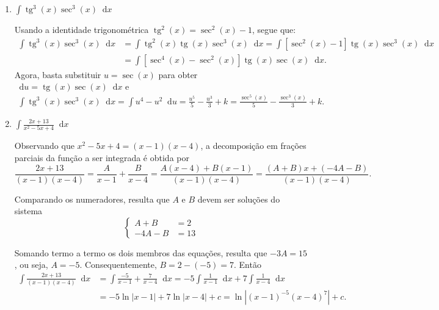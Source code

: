 \documentclass[12pt,a4paper]{article}
\newcommand*\diff{\mathop{}\!\mathrm{d}}
\newcommand*\tg{\operatorname{tg}}
\newcommand*\abs[1]{\left|#1\right|}
\begin{document}
\begin{enumerate}
\begin{enumerate}
\item $\displaystyle \int \tg^3(x)\sec^3(x) \diff x$

Usando a identidade trigonométrica $\tg^2(x) = \sec^2(x)-1$, segue que:
\begin{align*}
  \int \tg^3(x)\sec^3(x) \diff x
& = \int \tg^2(x)\tg(x)\sec^3(x) \diff x
  = \int \left[\sec^2(x) - 1\right]\tg(x)\sec^3(x) \diff x \\
& = \int \left[\sec^4(x) - \sec^2(x)\right]\tg(x)\sec(x) \diff x.
\end{align*}
Agora, basta substituir $u = \sec(x)$ para obter $\diff u = \tg(x)\sec(x) \diff x$ e
\begin{align*}
  \int \tg^3(x)\sec^3(x) \diff x
= \int u^4 - u^2 \diff u
= \frac{u^5}{5} - \frac{u^3}{3} + k
= \frac{\sec^5(x)}{5} - \frac{\sec^3(x)}{3} + k.
\end{align*}

\item $\displaystyle \int \frac{2x + 13}{x^2-5 x+4} \diff x$

Observando que $x^2 - 5x + 4 = (x-1)(x-4)$, a decomposição em frações parciais da função a ser integrada é obtida por
\[
\frac{2x + 13}{(x-1)(x-4)}
= \frac{A}{x-1} + \frac{B}{x-4}
= \frac{A(x-4) + B(x-1)}{(x-1)(x-4)}
= \frac{(A+B)x +(-4A-B)}{(x-1)(x-4)}.
\]

Comparando os numeradores, resulta que $A$ e $B$ devem ser soluções do sistema
\[
\begin{cases}
  A + B &= 2 \\
-4A - B &= 13
\end{cases}
\]

Somando termo a termo os dois membros das equações, resulta que $-3A = 15$, ou seja, $A=-5$. Consequentemente, $B = 2-(-5) = 7$. Então
\begin{align*}
\int \frac{2x + 13}{(x-1)(x-4)} \diff x
& = \int \frac{-5}{x-1} + \frac{7}{x-4} \diff x
  = -5 \int \frac{1}{x-1} \diff x + 7 \int \frac{1}{x-4} \diff x \\
& = -5 \ln\abs{ x-1 } + 7 \ln\abs{x-4} + c
  = \ln\abs{ (x-1)^{-5} (x-4)^7} + c.
\end{align*}

\end{enumerate}
\end{enumerate}
\end{document}

